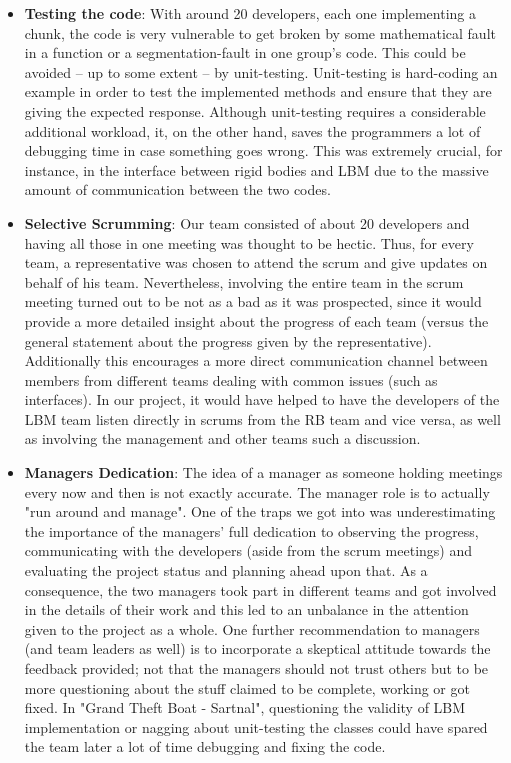 \begin{itemize}
  \item \textbf{Testing the code}: With around 20 developers, each one implementing a chunk, the code is very vulnerable to get broken by some mathematical fault in a function or a segmentation-fault in one group's code. This could be avoided -- up to some extent -- by unit-testing. Unit-testing is hard-coding an example in order to test the implemented methods and ensure that they are giving the expected response. Although unit-testing requires a considerable additional workload, it, on the other hand, saves the programmers a lot of debugging time in case something goes wrong. This was extremely crucial, for instance, in the interface between rigid bodies and LBM due to the massive amount of communication between the two codes.
  \item \textbf{Selective Scrumming}: Our team consisted of about 20 developers and having all those in one meeting was thought to be hectic. Thus, for every team, a representative was chosen to attend the scrum and give updates on behalf of his team. Nevertheless, involving the entire team in the scrum meeting turned out to be not as a bad as it was prospected, since it would provide a more detailed insight about the progress of each team (versus the general statement about the progress given by the representative). Additionally this encourages a more direct communication channel between members from different teams dealing with common issues (such as interfaces).  In our project, it would have helped to have the developers of the LBM team listen directly in scrums from the RB team and vice versa, as well as involving the management and other teams such a discussion.
  \item \textbf{Managers Dedication}: The idea of a manager as someone holding meetings every now and then is not exactly accurate. The manager role is to actually "run around and manage". One of the traps we got into was underestimating the importance of the managers' full dedication to observing the progress, communicating with the developers (aside from the scrum meetings) and evaluating the project status and planning ahead upon that. As a consequence, the two managers took part in different teams and got involved in the details of their work and this led to an unbalance in the attention given to the project as a whole. One further recommendation to managers (and team leaders as well) is to incorporate a skeptical attitude towards the feedback provided; not that the managers should not trust others but to be more questioning about the stuff claimed to be complete, working or got fixed. In "Grand Theft Boat - Sartnal", questioning the validity of LBM implementation or nagging about unit-testing the classes could have spared the team later a lot of time debugging and fixing the code.

\end{itemize}
